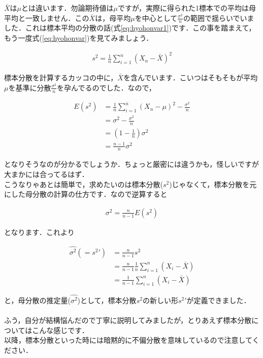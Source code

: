 \documentclass[11pt,a4paper,uplatex]{ujreport} 	%
\begin{document}
$\bar{X}$は$\mu$とは違います．勿論期待値は$\mu$ですが，実際に得られた1標本での平均は母平均と一致しません．この$\bar{X}$は，母平均$\mu$を中心として$\frac{\sigma^2}{n}$の範囲で揺らいでいました．これは標本平均の分散の話(式\ref{eq:hyohonvar1})です．この事を踏まえて，もう一度式(\ref{eq:hyohonvar})を見てみましょう．

\begin{align}
  s^2 = \frac{1}{n} \sum_{i=1}^n(X_n - \bar{X})^2
\end{align}

標本分散を計算するカッコの中に，$\bar{X}$を含んでいます．こいつはそもそもが平均$\mu$を基準に分散$\frac{\sigma^2}{n}$を孕んでるのでした．なので，

\begin{align}
  E(s^2) &= \frac{1}{n} \sum_{i=1}^n(X_n - \mu)^2 - \frac{\sigma^2}{n}\\
      &= \sigma^2 - \frac{\sigma^2}{n}\\
      &= (1-\frac{1}{n})\sigma^2\\
      &= \frac{n-1}{n}\sigma^2
\end{align}

となりそうなのが分かるでしょうか．ちょっと厳密には違うかも，怪しいですが大まかには合ってるはず．\\

こうなりゃあとは簡単で，求めたいのは標本分散($s^2$)じゃなくて，標本分散を元にした母分散の計算の仕方です．なので逆算すると

\begin{align}
  \sigma^2 = \frac{n}{n-1}E(s^2)
\end{align}

となります．これより

\begin{align}
  \hat{\sigma^2}(=s^2\prime) &= \frac{n}{n-1}s^2\\
                 &= \frac{n}{n-1}\frac{1}{n}\sum_{i=1}^n (X_i - \bar{X})\\
                 &= \frac{1}{n-1}\sum_{i=1}^n (X_i - \bar{X})
\end{align}

と，母分散の推定量($\hat{\sigma^2}$)として，標本分散$s^2$の新しい形$s^2\prime$が定義できました．\\
\\

ふう，自分が結構悩んだので丁寧に説明してみましたが，とりあえず標本分散についてはこんな感じです．\\

以降，標本分散といった時には暗黙的に不偏分散を意味しているので注意してください．
\end{document}
